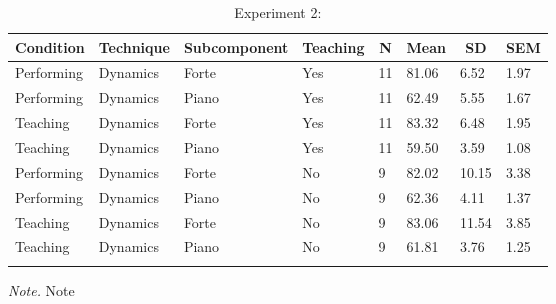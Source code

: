 \documentclass[
  man,floatsintext]{apa6}
\begin{document}
\begin{table}[tbp]

\begin{center}
\begin{threeparttable}

\caption{\label{tab:dyn-teaching-desc-2}Experiment 2:}

\begin{tabular}{llllllll}
\toprule
Condition & \multicolumn{1}{c}{Technique} & \multicolumn{1}{c}{Subcomponent} & \multicolumn{1}{c}{Teaching} & \multicolumn{1}{c}{N} & \multicolumn{1}{c}{Mean} & \multicolumn{1}{c}{SD} & \multicolumn{1}{c}{SEM}\\
\midrule
Performing & Dynamics & Forte & Yes & 11 & 81.06 & 6.52 & 1.97\\
Performing & Dynamics & Piano & Yes & 11 & 62.49 & 5.55 & 1.67\\
Teaching & Dynamics & Forte & Yes & 11 & 83.32 & 6.48 & 1.95\\
Teaching & Dynamics & Piano & Yes & 11 & 59.50 & 3.59 & 1.08\\
Performing & Dynamics & Forte & No & 9 & 82.02 & 10.15 & 3.38\\
Performing & Dynamics & Piano & No & 9 & 62.36 & 4.11 & 1.37\\
Teaching & Dynamics & Forte & No & 9 & 83.06 & 11.54 & 3.85\\
Teaching & Dynamics & Piano & No & 9 & 61.81 & 3.76 & 1.25\\
\bottomrule
\addlinespace
\end{tabular}

\begin{tablenotes}[para]
\normalsize{\textit{Note.} Note}
\end{tablenotes}

\end{threeparttable}
\end{center}

\end{table}
\end{document}
